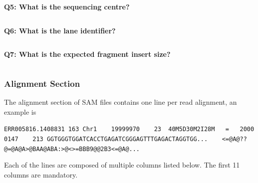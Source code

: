 \documentclass[11pt]{article}
\makeatletter
\newcommand{\boxspacing}{\kern\kvtcb@left@rule\kern\kvtcb@boxsep}
\newcommand{\prompt}[4]{
        {\ttfamily\llap{{\color{#2}[#3]:\hspace{3pt}#4}}\vspace{-\baselineskip}}
    }
\makeatother
\begin{document}
    \textbf{Q5: What is the sequencing centre?}

    \begin{tcolorbox}[breakable, size=fbox, boxrule=1pt, pad at break*=1mm,colback=cellbackground, colframe=cellborder]
\prompt{In}{incolor}{ }{\boxspacing}
\begin{Verbatim}[commandchars=\\\{\}]

\end{Verbatim}
\end{tcolorbox}

    \textbf{Q6: What is the lane identifier?}

    \begin{tcolorbox}[breakable, size=fbox, boxrule=1pt, pad at break*=1mm,colback=cellbackground, colframe=cellborder]
\prompt{In}{incolor}{ }{\boxspacing}
\begin{Verbatim}[commandchars=\\\{\}]

\end{Verbatim}
\end{tcolorbox}

    \textbf{Q7: What is the expected fragment insert size?}

    \begin{tcolorbox}[breakable, size=fbox, boxrule=1pt, pad at break*=1mm,colback=cellbackground, colframe=cellborder]
\prompt{In}{incolor}{ }{\boxspacing}
\begin{Verbatim}[commandchars=\\\{\}]

\end{Verbatim}
\end{tcolorbox}

    \hypertarget{alignment-section}{%
\subsubsection{Alignment Section}\label{alignment-section}}

The alignment section of SAM files contains one line per read alignment,
an example is

\texttt{ERR005816.1408831\ 163\ Chr1\ \ \ \ 19999970\ \ \ \ 23\ \ 40M5D30M2I28M\ \ \ =\ \ \ 20000147\ \ \ \ 213\ GGTGGGTGGATCACCTGAGATCGGGAGTTTGAGACTAGGTGG...\ \ \ \ \textless{}=@A@??@=@A@A\textgreater{}@BAA@ABA:\textgreater{}@\textless{}\textgreater{}=BBB9@@2B3\textless{}=@A@...}

Each of the lines are composed of multiple columns listed below. The
first 11 columns are mandatory.
\end{document}
